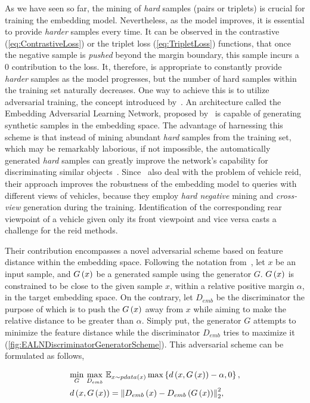 As we have seen so far, the mining of \emph{hard} samples (pairs or triplets) is crucial for training the embedding model. Nevertheless, as the model improves, it is essential to provide \emph{harder} samples every time. It can be observed in the contrastive (\cref{eq:ContrastiveLoss}) or the triplet loss (\cref{eq:TripletLoss}) functions, that once the negative sample is \emph{pushed} beyond the margin boundary, this sample incurs a $0$ contribution to the loss. It, therefore, is appropriate to constantly provide \emph{harder} samples as the model progresses, but the number of hard samples within the training set naturally decreases. One way to achieve this is to utilize adversarial training, the concept introduced by~\cite{Goodfellow2014}. An architecture called the Embedding Adversarial Learning Network, proposed by~\cite{Lou2019} is capable of generating synthetic samples in the embedding space. The advantage of harnessing this scheme is that instead of mining abundant \emph{hard} samples from the training set, which may be remarkably laborious, if not impossible, the automatically generated \emph{hard} samples can greatly improve the network's capability for discriminating similar objects~\cite{Lou2019}. Since~\cite{Lou2019} also deal with the problem of vehicle \gls{reid}, their approach improves the robustness of the embedding model to queries with different views of vehicles, because they employ \emph{hard negative} mining and \emph{cross-view} generation during the training. Identification of the corresponding rear viewpoint of a vehicle given only its front viewpoint and vice versa casts a challenge for the \gls{reid} methods.

Their contribution encompasses a novel adversarial scheme based on feature distance within the embedding space. Following the notation from~\cite{Lou2019}, let $x$ be an input sample, and ${G} \left( x \right)$ be a generated sample using the generator $G$. ${G} \left( x \right)$ is constrained to be close to the given sample $x$, within a relative positive margin $\alpha$, in the target embedding space. On the contrary, let $D_{emb}$ be the discriminator the purpose of which is to push the ${G} \left( x \right)$ away from $x$ while aiming to make the relative distance to be greater than $\alpha$. Simply put, the generator $G$ attempts to minimize the feature distance while the discriminator $D_{emb}$ tries to maximize it (\cref{fig:EALNDiscriminatorGeneratorScheme}). This adversarial scheme can be formulated as follows,

\begin{equation}
    \begin{aligned}
        &\underset{G}{\min} \ \underset{D_{emb}}{\max} \ \mathbb{E}_{x \sim \func{pdata}{x}} \max \cbrackets{\func{d}{x, \func{G}{x}} - \alpha, 0},\\
        &\func{d}{x, \func{G}{x}} = \euclnorm{\func{D_{emb}}{x} - \func{D_{emb}}{\func{G}{x}}}^2,
    \end{aligned}
\end{equation}

